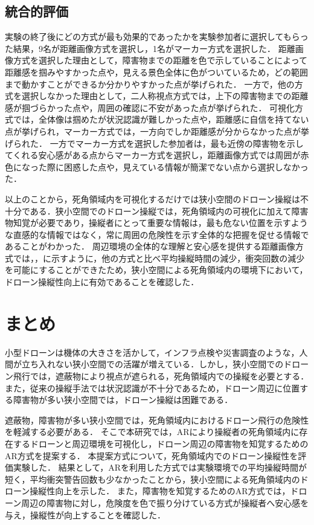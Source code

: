\documentclass[submit, sigrecommended]{ipsj}
\begin{document}
\subsection{統合的評価}
実験の終了後にどの方式が最も効果的であったかを実験参加者に選択してもらった結果，9名が距離画像方式を選択し，1名がマーカー方式を選択した．
距離画像方式を選択した理由として，障害物までの距離を色で示していることによって距離感を掴みやすかった点や，見える景色全体に色がついているため，どの範囲まで動かすことができるか分かりやすかった点が挙げられた．
一方で，他の方式を選択しなかった理由として，二人称視点方式では，上下の障害物までの距離感が掴づらかった点や，周囲の確認に不安があった点が挙げられた．
可視化方式では，全体像は掴めたが状況認識が難しかった点や，距離感に自信を持てない点が挙げられ，マーカー方式では，一方向でしか距離感が分からなかった点が挙げられた．
一方でマーカー方式を選択した参加者は，最も近傍の障害物を示してくれる安心感がある点からマーカー方式を選択し，距離画像方式では周囲が赤色になった際に困惑した点や，見えている情報が簡潔でない点から選択しなかった．
\par
以上のことから，死角領域内を可視化するだけでは狭小空間のドローン操縦は不十分である．狭小空間でのドローン操縦では，死角領域内の可視化に加えて障害物知覚が必要であり，操縦者にとって重要な情報は，最も危ない位置を示すような直感的な情報ではなく，常に周囲の危険性を示す全体的な把握を促せる情報であることがわかった．
周辺環境の全体的な理解と安心感を提供する距離画像方式では，，に示すように，他の方式と比べ平均操縦時間の減少，衝突回数の減少を可能にすることができたため，狭小空間による死角領域内の環境下において，ドローン操縦性向上に有効であることを確認した．

\section{まとめ}
\label{sec:Conclusion}
小型ドローンは機体の大きさを活かして，インフラ点検や災害調査のような，人間が立ち入れない狭小空間での活躍が増えている．しかし，狭小空間でのドローン飛行では，遮蔽物により視点が遮られる，死角領域内での操縦を必要とする．また，従来の操縦手法では状況認識が不十分であるため，ドローン周辺に位置する障害物が多い狭小空間では，ドローン操縦は困難である．\par
遮蔽物，障害物が多い狭小空間では，死角領域内におけるドローン飛行の危険性を軽減する必要がある．
そこで本研究では，ARにより操縦者の死角領域内に存在するドローンと周辺環境を可視化し，ドローン周辺の障害物を知覚するためのAR方式を提案する．
本提案方式について，死角領域内でのドローン操縦性を評価実験した．
結果として，ARを利用した方式では実験環境での平均操縦時間が短く，平均衝突警告回数も少なかったことから，狭小空間による死角領域内のドローン操縦性向上を示した．
また，障害物を知覚するためのAR方式では，ドローン周辺の障害物に対し，危険度を色で振り分けている方式が操縦者へ安心感を与え，操縦性が向上することを確認した．
\end{document}
